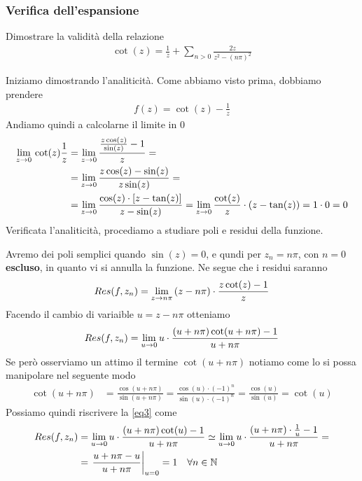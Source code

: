\subsubsection{Verifica dell'espansione}

Dimostrare la validità della relazione
\begin{align}
	\cot(z) = \frac{1}{z} + \sum_{n>0} \frac{2z}{z^2 - (n\pi)^2}
\end{align}

Iniziamo dimostrando l'analiticità. Come abbiamo visto prima, dobbiamo prendere
\begin{align}
	f(z) = \cot(z) - \frac{1}{z}
\end{align}
Andiamo quindi a calcolarne il limite in 0
\begin{align}
	\underset{z \rightarrow 0}{\lim} \, \cot(z) \frac{1}{z} &= \underset{z \rightarrow 0}{\lim} \, \frac{\frac{z\cos(z)}{\sin(z)} -1}{z} = \nonumber\\
	&= \underset{z \rightarrow 0}{\lim} \, \frac{z\cos(z) - \sin(z)}{z\sin (z)} = \nonumber\\
	&= \underset{z \rightarrow 0}{\lim} \,\frac{\cos(z) \cdot [z - \tan (z)]}{z - \sin(z)} = \underset{z \rightarrow 0}{\lim} \, \frac{\cot(z)}{z} \cdot(z-\tan(z)) = 1\cdot 0 = 0
\end{align}
Verificata l'analiticità, procediamo a studiare poli e residui della funzione. 

Avremo dei poli semplici quando $\sin(z) = 0$, e qundi per $z_n=n\pi$, con $n=0$ \textbf{escluso}, in quanto vi si annulla la funzione. Ne segue che i residui saranno
\begin{align}
	Res(f,z_n) = \underset{z \rightarrow n\pi}{\lim} \,  (z-n\pi) \cdot \frac{z\cot(z) -1}{z}
\end{align} 
Facendo il cambio di variaible $u=z-n\pi$ otteniamo
\begin{align}
	Res(f,z_n) = \underset{u \rightarrow 0}{\lim} \, u \cdot \frac{(u+n\pi)\cot(u+n\pi) -1}{u+n\pi} \label{eq3}
\end{align} 
Se però osserviamo un attimo il termine $\cot(u+n\pi)$ notiamo come lo si possa manipolare nel seguente modo
\begin{align}
	\cot(u+n\pi) &= \frac{\cos(u+n\pi)}{\sin(u+n\pi)} = \frac{\cos(u)\cdot(-1)^n}{\sin(u)\cdot(-1)^n} = \frac{\cos(u)}{\sin(u)} = \cot(u)
\end{align}
Possiamo quindi riscrivere la \ref{eq3} come
\begin{align}
	Res(f,z_n) &= \underset{u \rightarrow 0}{\lim} \, u \cdot \frac{(u+n\pi)\cot(u) -1}{u+n\pi} \simeq \underset{u \rightarrow 0}{\lim} \, u\cdot \frac{(u+n\pi)\cdot \frac{1}{u} -1}{u+n\pi} = \nonumber\\
	&= \left. \frac{u+n\pi -u}{u+n\pi} \right|_{u=0} = 1 \quad \forall n\in \mathbb{N}
\end{align} 


